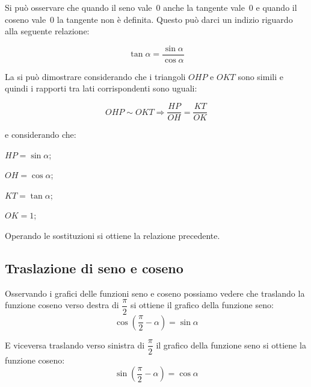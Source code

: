 Si può osservare che quando il seno vale~0 anche la tangente vale~0 e quando 
il coseno vale~0 la tangente non è definita. Questo può darci un indizio 
riguardo alla seguente relazione:

\[\tan \alpha = \frac{\sin \alpha}{\cos \alpha}\]

La si può dimostrare considerando che i triangoli \(OHP\) e \(OKT\) sono simili
e quindi i rapporti tra lati corrispondenti sono uguali:

\[OHP \sim OKT \Rightarrow \frac{HP}{OH} = \frac{KT}{OK}\]

\begin{minipage}{.3\textwidth}
e considerando che:
\begin{itemize*}
 \item \(HP = \sin \alpha\);
 \item \(OH = \cos \alpha\);
 \item \(KT = \tan \alpha\);
 \item \(OK = 1\);
\end{itemize*}
Operando le sostituzioni si ottiene la relazione precedente.
\end{minipage}
\begin{minipage}{.6\textwidth}
\begin{center}
 
\end{center}
\end{minipage}

\subsection{Traslazione di seno e coseno}

Osservando i grafici delle funzioni seno e coseno possiamo vedere che 
traslando la funzione coseno verso destra di \(\dfrac{\pi}{2}\) si ottiene il 
grafico della funzione seno:
\[\cos\left(\frac{\pi}{2}-\alpha\right)=\sin\alpha\]
\vspace{-6mm}
  \begin{center}
\begin{inaccessibleblock}
    
\end{inaccessibleblock}
  \end{center}
\vspace{-6pt}
E viceversa traslando verso sinistra di \(\dfrac{\pi}{2}\) il grafico della 
funzione seno si ottiene la funzione coseno:
\[\sin\left(\frac{\pi}{2}-\alpha\right)=\cos\alpha\]

